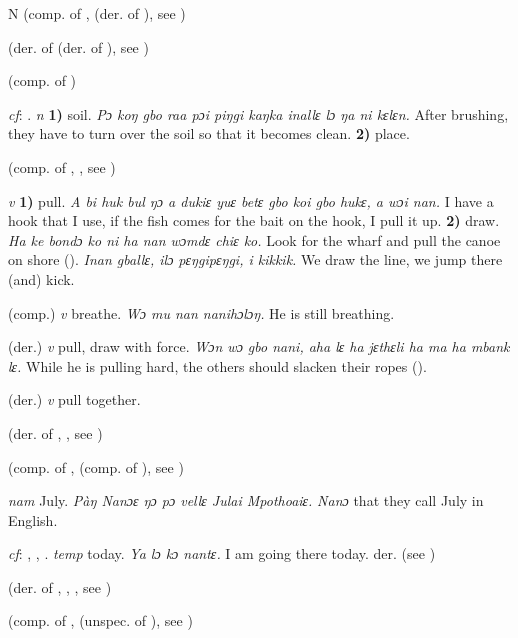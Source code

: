 \begin{letter}{N}
 (comp. of ,  (der. of ), see ) 

 (der. of  (der. of ), see ) 

 (comp. of ) 

 \textit{cf}: . \textit{n} \textbf{1)} soil. \textit{Pɔ koŋ gbo raa pɔi piŋgi kaŋka inallɛ lɔ ŋa ni kɛlɛn.} After brushing, they have to turn over the soil so that it becomes clean. \textbf{2)} place.

 (comp. of , , see )

 \textit{v} \textbf{1)} pull. \textit{A bi huk bul ŋɔ a dukiɛ yuɛ betɛ gbo koi gbo hukɛ, a wɔi nan.} I have a hook that I use, if the fish comes for the bait on the hook, I pull it up. \textbf{2)} draw. \textit{Ha ke bondɔ ko ni ha nan wɔmdɛ chiɛ ko.} Look for the wharf and pull the canoe on shore (\citealt{Pichl1967}). \textit{Inan gballɛ, ilɔ pɛŋgipɛŋgi, i kikkik.} We draw the line, we jump there (and) kick.

 (comp.) \textit{v} breathe. \textit{Wɔ mu nan nanihɔlɔŋ.} He is still breathing. 

 (der.) \textit{v} pull, draw with force. \textit{Wɔn wɔ gbo nani, aha lɛ ha jɛthɛli ha ma ha mbank lɛ.} While he is pulling hard, the others should slacken their ropes (\citealt{Pichl1967}). 

 (der.) \textit{v} pull together.

 (der. of , , see ) 

 (comp. of ,  (comp. of ), see ) 

 \textit{nam} July. \textit{Pàŋ Nanɔɛ ŋɔ pɔ vellɛ Julai Mpothoaiɛ.} \textit{Nanɔ} that they call July in English. 

 \textit{cf}: , , . \textit{temp} today. \textit{Ya lɔ kɔ nantɛ.} I am going there today. der.  (see ) 

 (der. of , , , see ) 

 (comp. of ,  (unspec. of ), see ) 


\end{letter}

